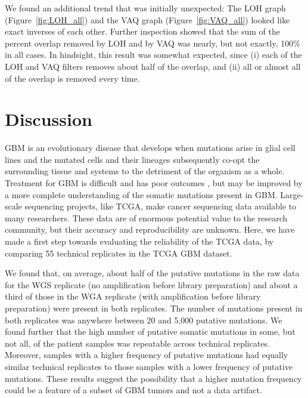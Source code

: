 \documentclass[11pt]{article} %
\begin{document}
We found an additional trend that was initially unexpected: The LOH graph (Figure~\ref{fig:LOH_all}) and the VAQ graph (Figure~\ref{fig:VAQ_all}) looked like exact inverses of each other. Further inspection showed that the sum of the percent overlap removed by LOH and by VAQ was nearly, but not exactly, 100\% in all cases. In hindsight, this result was somewhat expected, since (i) each of the LOH and VAQ filters removes about half of the overlap, and (ii) all or almost all of the overlap is removed every time.

\section*{Discussion}

GBM is an evolutionary disease that develops when mutations arise in glial cell lines and the mutated cells and their lineages subsequently co-opt the surrounding tissue and systems to the detriment of the organism as a whole. Treatment for GBM is difficult and has poor outcomes \citep{GBM-stats}, but may be improved by a more complete understanding of the somatic mutations present in GBM. Large-scale sequencing projects, like TCGA, make cancer sequencing data available to many researchers. These data are of enormous potential value to the research community, but their accuracy and reproducibility are unknown. Here, we have made a first step towards evaluating the reliability of the TCGA data, by comparing 55 technical replicates in the TCGA GBM dataset.  

We found that, on average, about half of the putative mutations in the raw data for the WGS replicate (no amplification before library preparation) and about a third of those in the WGA replicate (with amplification before library preparation) were present in both replicates. The number of mutations present in both replicates was anywhere between 20 and 5,000 putative mutations. We found further that the high number of putative somatic mutations in some, but not all, of the patient samples was repeatable across technical replicates. Moreover, samples with a higher frequency of putative mutations had equally similar technical replicates to those samples with a lower frequency of putative mutations. These results suggest the possibility that a higher mutation frequency could be a feature of a subset of GBM tumors and not a data artifact.
\end{document}
